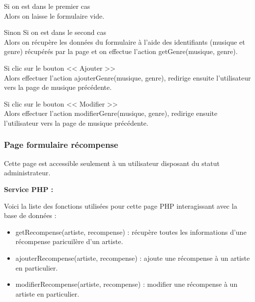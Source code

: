 \begin{paragraphe}

			\begin{paragraphe}
				Si on est dans le premier cas \\
				Alors on laisse le formulaire vide.
			\end{paragraphe}

			\begin{paragraphe}
				Sinon Si on est dans le second cas \\
				Alors on récupère les données du formulaire à l'aide des identifiants (musique et genre) récupérés par la page et on effectue l'action getGenre(musique, genre).
			\end{paragraphe}

			\begin{paragraphe}
				Si clic sur le bouton << Ajouter >> \\
				Alors effectuer l'action ajouterGenre(musique, genre), redirige ensuite l'utilisateur vers la page de musique précédente.
			\end{paragraphe}

			\begin{paragraphe}
				Si clic sur le bouton << Modifier >> \\
				Alors effectuer l'action modifierGenre(musique, genre), redirige ensuite l'utilisateur vers la page de musique précédente.
			\end{paragraphe}

	\clearpage

		\subsubsection{Page formulaire récompense}

			\begin{paragraphe}
				Cette page est accessible seulement à un utilisateur disposant du statut administrateur.
			\end{paragraphe}

			\begin{paragraphe}
				\textbf{Service PHP :}
			\end{paragraphe}

			\begin{paragraphe}
				Voici la liste des fonctions utilisées pour cette page PHP interagissant avec la base de données :
				\begin{itemize}
					\item getRecompense(artiste, recompense) : récupère toutes les informations d'une récompense paricuilère d'un artiste.
					\item ajouterRecompense(artiste, recompense) : ajoute une récompense à un artiste en particulier.
					\item modifierRecompense(artiste, recompense) : modifier une récompense à un artiste en particulier.
				\end{itemize}
			\end{paragraphe}


\end{paragraphe}
